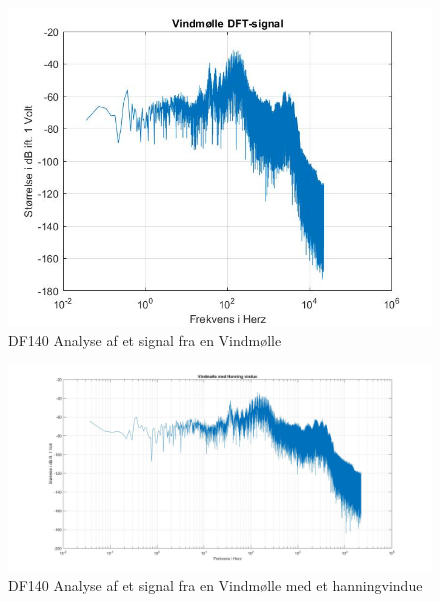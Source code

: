 \begin{figure}[H]
	\centering
	\includegraphics[width=140mm]{figures/Vind/DFT.jpg}
	\caption{DF140 Analyse af et signal fra en Vindmølle}
	\label{fig:Vind DF140}
\end{figure}

\begin{figure}[H]
	\centering
	\includegraphics[width=140mm]{figures/Vind/hanning.jpg}
	\caption{DF140 Analyse af et signal fra en Vindmølle med et hanningvindue}
	\label{fig:Vind hanning}
\end{figure}

